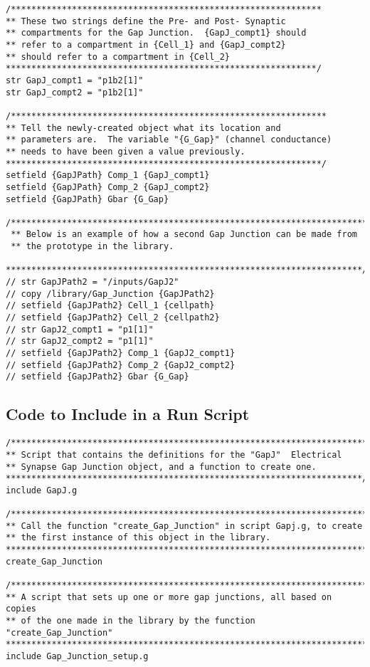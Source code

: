 \documentclass[12pt]{article}
\begin{document}
\begin{verbatim}
/*************************************************************
** These two strings define the Pre- and Post- Synaptic
** compartments for the Gap Junction.  {GapJ_compt1} should
** refer to a compartment in {Cell_1} and {GapJ_compt2}
** should refer to a compartment in {Cell_2}
*************************************************************/
str GapJ_compt1 = "p1b2[1]"
str GapJ_compt2 = "p1b2[1]"

/**************************************************************
** Tell the newly-created object what its location and
** parameters are.  The variable "{G_Gap}" (channel conductance)
** needs to have been given a value previously.
**************************************************************/
setfield {GapJPath} Comp_1 {GapJ_compt1}
setfield {GapJPath} Comp_2 {GapJ_compt2}
setfield {GapJPath} Gbar {G_Gap}

/***********************************************************************
 ** Below is an example of how a second Gap Junction can be made from
 ** the prototype in the library.
 **********************************************************************/
// str GapJPath2 = "/inputs/GapJ2"
// copy /library/Gap_Junction {GapJPath2}
// setfield {GapJPath2} Cell_1 {cellpath}
// setfield {GapJPath2} Cell_2 {cellpath2}
// str GapJ2_compt1 = "p1[1]"
// str GapJ2_compt2 = "p1[1]"
// setfield {GapJPath2} Comp_1 {GapJ2_compt1}
// setfield {GapJPath2} Comp_2 {GapJ2_compt2}
// setfield {GapJPath2} Gbar {G_Gap}
\end{verbatim}

\subsection*{Code to Include in a Run Script}

\begin{verbatim}
/***********************************************************************
** Script that contains the definitions for the "GapJ"  Electrical
** Synapse Gap Junction object, and a function to create one.
**********************************************************************/
include GapJ.g

/***********************************************************************
** Call the function "create_Gap_Junction" in script Gapj.g, to create
** the first instance of this object in the library.
***********************************************************************/
create_Gap_Junction

/*************************************************************************
** A script that sets up one or more gap junctions, all based on copies
** of the one made in the library by the function "create_Gap_Junction"
************************************************************************/
include Gap_Junction_setup.g
\end{verbatim}
\end{document}
